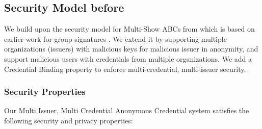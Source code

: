 \subsection{Security Model before}
We build upon the security model for Multi-Show ABCs from \cite{fuchsbauer_structure-preserving_2019} which is based on earlier work for group signatures \cite{hutchison_foundations_2005}. We extend it by supporting multiple organizations (issuers) with malicious keys for malicious issuer in anonymity, and support malicious users with credentials from multiple organizations. We add a Credential Binding property to enforce multi-credential, multi-issuer security.

\subsubsection{Security Properties}
Our Multi Issuer, Multi Credential Anonymous Credential system satisfies the following security and privacy properties:
